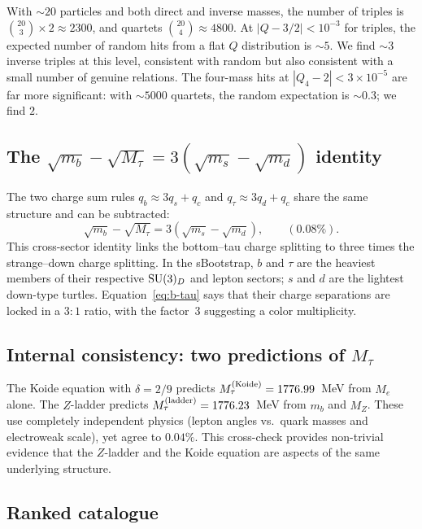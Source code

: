 \documentclass[11pt]{article}
\begin{document}
With ${\sim}20$ particles and both direct and inverse masses,
the number of triples is $\binom{20}{3}\times 2 \approx 2300$,
and quartets $\binom{20}{4}\approx 4800$.
At $|Q-3/2|<10^{-3}$ for triples, the expected number of
random hits from a flat $Q$ distribution is ${\sim}5$.  We find
${\sim}3$ inverse triples at this level, consistent with random
but also consistent with a small number of genuine relations.
The four-mass hits at $|Q_4-2|<3\times 10^{-5}$ are far more
significant: with ${\sim}5000$ quartets, the random expectation
is ${\sim}0.3$; we find $2$.

\subsection{The $\sqrt{m_b}-\sqrt{M_\tau} = 3(\sqrt{m_s}-\sqrt{m_d})$ identity}

The two charge sum rules $q_b \approx 3q_s + q_c$ and
$q_\tau \approx 3q_d + q_c$ share the same structure and can
be subtracted:
\begin{equation}
  \boxed{\sqrt{m_b} - \sqrt{M_\tau}
  = 3\!\left(\sqrt{m_s}-\sqrt{m_d}\right),
  \qquad (0.08\%).}
  \label{eq:b-tau}
\end{equation}
This cross-sector identity links the bottom--tau charge
splitting to three times the strange--down charge splitting.
In the sBootstrap, $b$ and $\tau$ are the heaviest members
of their respective ${\rm SU}(3)_D$ and lepton sectors;
$s$ and $d$ are the lightest down-type turtles.
Equation~\eqref{eq:b-tau} says that their charge separations
are locked in a $3:1$ ratio, with the factor~$3$ suggesting
a color multiplicity.

\subsection{Internal consistency: two predictions of $M_\tau$}

The Koide equation with $\delta = 2/9$ predicts
$M_\tau^{(\rm Koide)} = 1776.99$~MeV from $M_e$ alone.
The $Z$-ladder predicts
$M_\tau^{(\rm ladder)} = 1776.23$~MeV from $m_b$ and $M_Z$.
These use completely independent physics (lepton angles vs.\
quark masses and electroweak scale), yet agree to $0.04\%$.
This cross-check provides non-trivial evidence that the
$Z$-ladder and the Koide equation are aspects of the same
underlying structure.

\subsection{Ranked catalogue}
\end{document}
